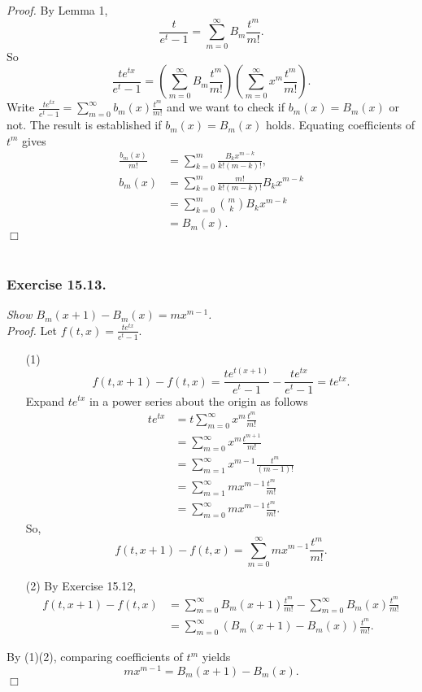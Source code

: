 \documentclass{article}
\begin{document}
\emph{Proof.}
By Lemma 1,
$$\frac{t}{e^t - 1} = \sum_{m=0}^{\infty} B_m \frac{t^m}{m!}.$$
So
$$
\frac{te^{tx}}{e^t - 1}
=
\left( \sum_{m=0}^{\infty} B_m \frac{t^m}{m!} \right)
\left( \sum_{m=0}^{\infty} x^m \frac{t^m}{m!} \right).$$
Write $\frac{te^{tx}}{e^t - 1} = \sum_{m=0}^{\infty} b_m(x) \frac{t^m}{m!}$
and we want to check if $b_m(x) = B_m(x)$ or not.
The result is established if $b_m(x) = B_m(x)$ holds.
Equating coefficients of $t^m$ gives
\begin{align*}
\frac{b_m(x)}{m!}
&= \sum_{k=0}^{m} \frac{B_k x^{m-k}}{k!(m-k)!}, \\
b_m(x)
&= \sum_{k=0}^{m} \frac{m!}{k!(m-k)!} B_k x^{m-k} \\
&= \sum_{k=0}^{m} {m \choose k} B_k x^{m-k} \\
&= B_m(x).
\end{align*}
$\Box$ \\\\






\subsubsection*{Exercise 15.13.}
\emph{Show $B_m(x+1) - B_m(x) = mx^{m-1}$.} \\

\emph{Proof.}
Let $f(t, x) = \frac{te^{tx}}{e^t - 1}$.
\begin{enumerate}
\item[(1)]
$$f(t, x+1) - f(t, x)
= \frac{te^{t(x+1)}}{e^t - 1} - \frac{te^{tx}}{e^t - 1}
= te^{tx}.$$
Expand $te^{tx}$ in a power series about the origin as follows
\begin{align*}
te^{tx}
&= t \sum_{m=0}^{\infty} x^m \frac{t^m}{m!} \\
&= \sum_{m=0}^{\infty} x^m \frac{t^{m+1}}{m!} \\
&= \sum_{m=1}^{\infty} x^{m-1} \frac{t^m}{(m-1)!} \\
&= \sum_{m=1}^{\infty} mx^{m-1} \frac{t^m}{m!} \\
&= \sum_{m=0}^{\infty} mx^{m-1} \frac{t^m}{m!}.
\end{align*}
So,
$$f(t, x+1) - f(t, x) = \sum_{m=0}^{\infty} mx^{m-1} \frac{t^m}{m!}.$$
\item[(2)]
By Exercise 15.12,
\begin{align*}
f(t, x+1) - f(t, x)
&= \sum_{m=0}^{\infty} B_m(x+1) \frac{t^m}{m!}
- \sum_{m=0}^{\infty} B_m(x) \frac{t^m}{m!} \\
&= \sum_{m=0}^{\infty} (B_m(x+1) - B_m(x)) \frac{t^m}{m!}.
\end{align*}
\end{enumerate}
By (1)(2), comparing coefficients of $t^m$ yields
$$mx^{m-1} = B_m(x+1) - B_m(x).$$
$\Box$ \\\\
\end{document}
